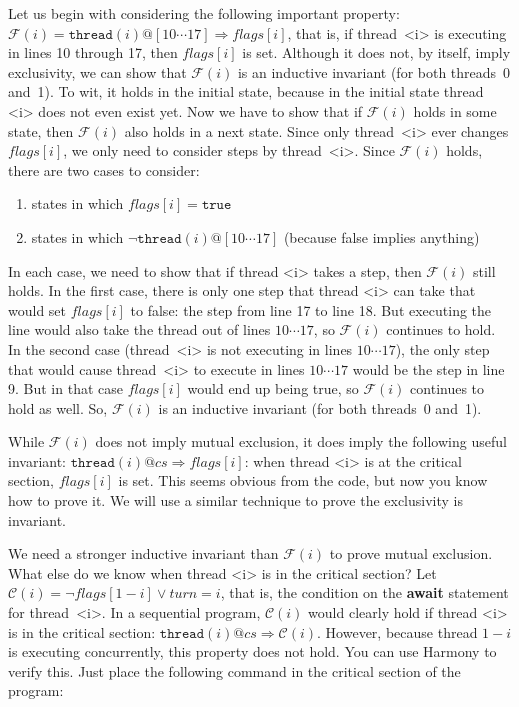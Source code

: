 \documentclass{report}
\begin{document}
Let us begin with considering the following important property:
$\mathcal{F}(i) = \mathtt{thread}(i)@[10 \cdots 17] \Rightarrow \mathit{flags}[i]$,
that is, if thread~<{i}> is executing in lines 10 through 17, then $\mathit{flags}[i]$
is set.
Although it does not, by itself, imply exclusivity, we can show that
$\mathcal{F}(i)$ is an inductive invariant (for both threads~0 and~1).
To wit, it holds in the initial state, because in the initial state thread <{i}> does
not even exist yet.
Now we have to show that if $\mathcal{F}(i)$ holds in some state, then
$\mathcal{F}(i)$ also holds in a next state.
Since only thread~<{i}> ever changes $\mathit{flags}[i]$, we only need to
consider steps by thread~<{i}>.
Since $\mathcal{F}(i)$ holds, there are two cases to consider:
\begin{enumerate}
\item states in which $\mathit{flags}[i] = \texttt{true}$
\item states in which $\lnot \mathtt{thread}(i)@[10 \cdots 17]$
(because false implies anything)
\end{enumerate}
In each case, we need to show that if thread <{i}> takes a step, then
$\mathcal{F}(i)$ still holds.
In the first case, there is only one step that thread <{i}> can take that would
set $\mathit{flags}[i]$ to false: the step from line 17 to line 18.  But executing the line
would also take the thread out of lines $10 \cdots 17$, so $\mathcal{F}(i)$ continues to hold.
In the second case (thread~<{i}> is not executing in lines $10 \cdots 17$), the only step
that would cause thread~<{i}> to execute in lines $10 \cdots 17$ would be the step in line 9.
But in that case $\mathit{flags}[i]$ would end up being true, so
$\mathcal{F}(i)$ continues to hold as well.
So, $\mathcal{F}(i)$ is an inductive invariant (for both threads~0 and~1).

While $\mathcal{F}(i)$ does not imply mutual exclusion, it does imply the following useful
invariant: $\mathtt{thread}(i)@cs \Rightarrow \mathit{flags}[i]$: when thread <{i}> is
at the critical section, $\mathit{flags}[i]$ is set.  This seems obvious from the code,
but now you know how to prove it.
We will use a similar technique to prove the exclusivity is invariant.

We need a stronger inductive invariant than $\mathcal{F}(i)$ to prove mutual exclusion.
What else do we know when thread <{i}> is in the critical section?
Let $\mathcal{C}(i) = \lnot\mathit{flags}[1 - i] \lor \mathit{turn} = i$, that is,
the condition on the \textbf{await} statement for thread~<{i}>.
In a sequential program, $\mathcal{C}(i)$ would clearly hold if thread <{i}> is in
the critical section: $\mathtt{thread}(i)@cs \Rightarrow \mathcal{C}(i)$.
However, because thread $1-i$ is executing concurrently, this property does not
hold.
You can use Harmony to verify this.  Just place the following command
in the critical section of the program:
\end{document}
